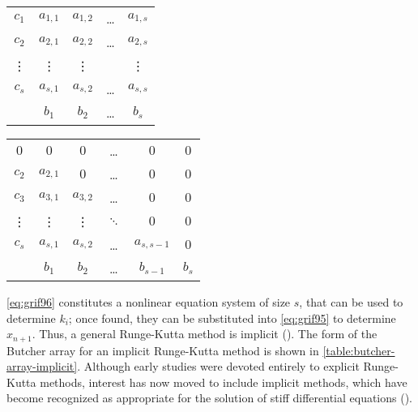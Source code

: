 \noindent\begin{minipage}[t]{0.5\textwidth}%
    \centering
    \label{table:butcher-array-implicit}
    \begin{tabular}{c|cccc}
        $c_1$  & $a_{1,1}$ & $a_{1,2}$ & \dots & $a_{1,s}$ \\
        $c_2$  & $a_{2,1}$ & $a_{2,2}$ & \dots & $a_{2,s}$ \\
        \vdots & \vdots    & \vdots    &       & \vdots \\ 
        $c_s$  & $a_{s,1}$ & $a_{s,2}$ & \dots & $a_{s,s}$ \\
        \hline
               & $b_1$     & $b_2$     & \dots & $b_s$ \\
    \end{tabular}
    \captionsetup{width=0.8\linewidth}
\end{minipage}%
\begin{minipage}[t]{0.5\textwidth}%
    \centering
    \label{table:butcher-array-explicit}
    \begin{tabular}{c|ccccc}
        $0$    & $0$       & $0$       & \dots  & $0$         & $0$ \\
        $c_2$  & $a_{2,1}$ & $0$       & \dots  & $0$         & $0$ \\
        $c_3$  & $a_{3,1}$ & $a_{3,2}$ & \dots  & $0$         & $0$ \\
        \vdots & \vdots    & \vdots    & $\ddots$ & $0$         & $0$ \\ 
        $c_s$  & $a_{s,1}$ & $a_{s,2}$ & \dots  & $a_{s,s-1}$ & $0$ \\
        \hline
               & $b_1$     & $b_2$     & \dots & $b_{s-1}$    & $b_s$ \\
    \end{tabular}
    \captionsetup{width=0.8\linewidth}
\end{minipage}%

\autoref{eq:grif96} constitutes a nonlinear equation system of size $s$, that can 
be used to determine $k_i$; once found, they can be substituted into \autoref{eq:grif95} 
to determine $x_{n+1}$. Thus, a general Runge-Kutta method is implicit (\cite{Griffiths2010}).
The form of the Butcher array for an implicit Runge-Kutta method is shown in 
\autoref{table:butcher-array-implicit}. Although early studies were devoted entirely 
to explicit Runge-Kutta methods, interest has now moved to include implicit methods, 
which have become recognized as appropriate for the solution of stiff differential 
equations (\cite{Butcher2016}).

